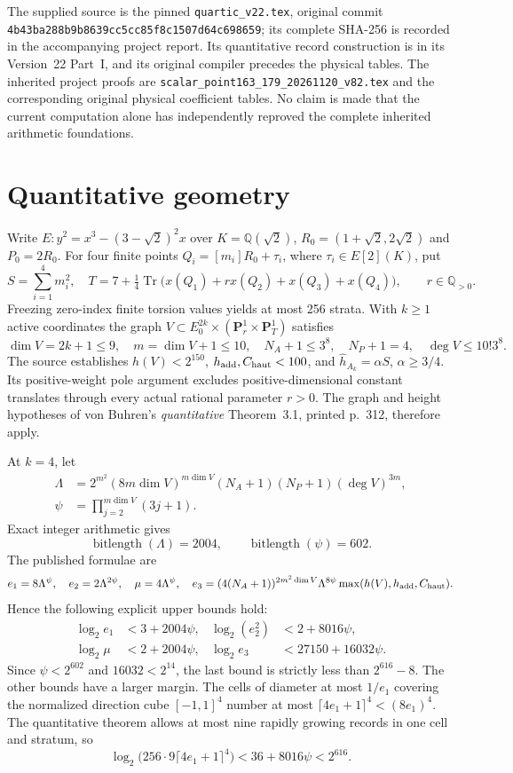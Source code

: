 \documentclass[11pt]{article}
\newcommand{\Q}{\mathbb Q}
\newcommand{\Tr}{\operatorname{Tr}}
\begin{document}
The supplied source is the pinned
\texttt{quartic\_v22.tex}, original commit
\texttt{4b43ba288b9b8639cc5cc85f8c1507d64c698659};
its complete SHA-256 is recorded in the accompanying project report.
Its quantitative record construction is in its
Version~22 Part~I, and its original compiler precedes the
physical tables. The inherited project proofs are
\texttt{scalar\_point163\_179\_20261120\_v82.tex}
and the corresponding original physical coefficient tables.
No claim is made that the current computation alone has
independently reproved the complete inherited arithmetic foundations.

\section{Quantitative geometry}
Write \(E:y^2=x^3-(3-\sqrt2)^2x\) over
\(K=\Q(\sqrt2)\), \(R_0=(1+\sqrt2,2\sqrt2)\)
and \(P_0=2R_0\).
For four finite points \(Q_i=[m_i]R_0+\tau_i\),
where \(\tau_i\in E[2](K)\), put
\[
S=\sum_{i=1}^4m_i^2,\quad
T=7+\tfrac14\Tr\bigl(x(Q_1)+r x(Q_2)+x(Q_3)+x(Q_4)\bigr),
\qquad r\in\Q_{>0}.
\]
Freezing zero-index finite torsion values yields at most 256
strata. With \(k\ge1\) active coordinates the graph
\(V\subset E_0^{2k}\times(\mathbf P^1_r\times\mathbf P^1_T)\)
satisfies
\[
\dim V=2k+1\le9,\quad m=\dim V+1\le10,\quad
N_A+1\le3^8,\quad N_P+1=4,
\quad \deg V\le10!3^8.
\]
The source establishes \(h(V)<2^{150}\),
\(h_{\rm add},C_{\rm haut}<100\), and
\(\widehat h_{A_k}=\alpha S\), \(\alpha\ge3/4\).
Its positive-weight pole argument excludes positive-dimensional
constant translates through every actual rational parameter \(r>0\).
The graph and height hypotheses of von Buhren's
\emph{quantitative} Theorem~3.1, printed p.~312, therefore apply.

At \(k=4\), let
\[
\begin{split}
\Lambda&=
 2^{m^2}(8m\dim V)^{m\dim V}
 (N_A+1)(N_P+1)(\deg V)^{3m},\\
\psi&=\prod_{j=2}^{m\dim V}(3j+1).
\end{split}
\]
Exact integer arithmetic gives
\[
\operatorname{bitlength}(\Lambda)=2004,\qquad
\operatorname{bitlength}(\psi)=602.
\]
The published formulae are
\[
e_1=8\Lambda^\psi,\quad e_2=2\Lambda^{2\psi},
\quad\mu=4\Lambda^\psi,\quad
e_3=(4(N_A+1))^{2m^2\dim V}
 \Lambda^{8\psi}\max(h(V),h_{\rm add},C_{\rm haut}).
\]
Hence the following explicit upper bounds hold:
\[
\begin{aligned}
\log_2e_1&<3+2004\psi,&
\log_2(e_2^2)&<2+8016\psi,\\
\log_2\mu&<2+2004\psi,&
\log_2e_3&<27150+16032\psi.
\end{aligned}
\]
Since \(\psi<2^{602}\) and \(16032<2^{14}\),
the last bound is strictly less than \(2^{616}-8\).
The other bounds have a larger margin.
The cells of diameter at most \(1/e_1\)
covering the normalized direction cube \([-1,1]^4\)
number at most \(\lceil4e_1+1\rceil^4<(8e_1)^4\).
The quantitative theorem allows at most nine rapidly growing
records in one cell and stratum, so
\[
\log_2\bigl(256\cdot9\lceil4e_1+1\rceil^4\bigr)
<36+8016\psi<2^{616}.
\]
\end{document}
